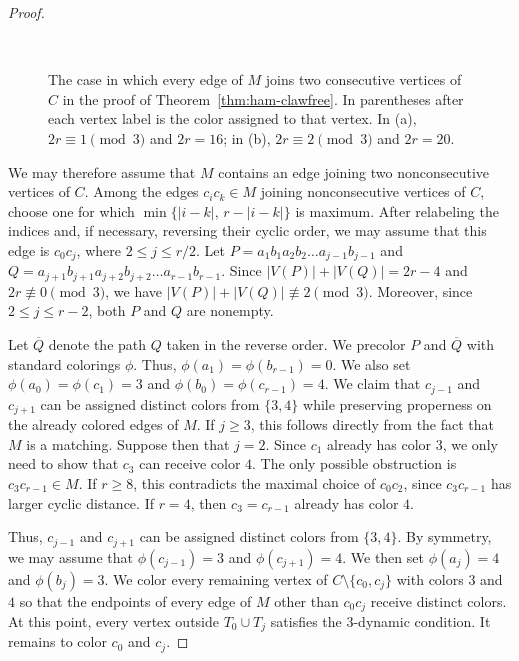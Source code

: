 \documentclass[10pt,a4paper]{article}
\theoremstyle{case}
\numberwithin{subcase}{case}
\begin{document}
\begin{proof}
\begin{figure}[H]
\begin{subfigure}{0.48\textwidth}
        \caption{$ $}
    \end{subfigure}

  \caption{The case in which every edge of $M$ joins two consecutive
vertices of $C$ in the proof of Theorem~\ref{thm:ham-clawfree}.
In parentheses after each vertex label is the color assigned to that
vertex. In (a), $2r\equiv1\pmod3$ and $2r=16$; in (b),
$2r\equiv2\pmod3$ and $2r=20$.}
    \label{fig:cubic-consecutive}
\end{figure}

We may therefore assume that $M$ contains an edge joining two
nonconsecutive vertices of $C$.
Among the edges $c_ic_k\in M$ joining nonconsecutive vertices of $C$,
choose one for which
$
\min\{|i-k|,\,r-|i-k|\}
$
is maximum. After relabeling the indices and, if necessary, reversing
their cyclic order, we may assume that this edge is $c_0c_j$, where
$
2\leq j\leq r/2.
$
Let
$
P=a_1b_1a_2b_2\ldots a_{j-1}b_{j-1}
$
and
$
Q=a_{j+1}b_{j+1}a_{j+2}b_{j+2}\ldots
a_{r-1}b_{r-1}.
$
Since
$
|V(P)|+|V(Q)|=2r-4
$
and $2r\not\equiv0\pmod3$, we have
$
|V(P)|+|V(Q)|\not\equiv2\pmod3.
$
Moreover, since $2\leq j\leq r-2$, both $P$ and $Q$ are nonempty.

Let $\overline{Q}$ denote the path $Q$ taken in the reverse order.
We precolor $P$ and $\overline{Q}$ with standard colorings $\phi$.
Thus, $\phi(a_1)=\phi(b_{r-1})=0$. We also set
$\phi(a_0)=\phi(c_1)=3$ and
$\phi(b_0)=\phi(c_{r-1})=4$.
We claim that $c_{j-1}$ and $c_{j+1}$ can be assigned distinct colors
from $\{3,4\}$ while preserving properness on the already colored edges
of $M$. If $j\geq3$, this follows directly from the fact that $M$ is a
matching. Suppose then that $j=2$. Since $c_1$ already has color $3$, we only
need to show that $c_3$ can receive color $4$. The only possible
obstruction is $c_3c_{r-1}\in M$. If $r\geq8$, this contradicts the
maximal choice of $c_0c_2$, since $c_3c_{r-1}$ has larger cyclic
distance. If $r=4$, then $c_3=c_{r-1}$ already has color $4$.

Thus, $c_{j-1}$ and $c_{j+1}$ can be assigned distinct colors from
$\{3,4\}$. By symmetry, we may assume that
$\phi(c_{j-1})=3$ and $\phi(c_{j+1})=4$. We then set
$\phi(a_j)=4$ and $\phi(b_j)=3$.
We color every remaining vertex of
$C\setminus\{c_0,c_j\}$ with colors $3$ and $4$ so that the endpoints
of every edge of $M$ other than $c_0c_j$ receive distinct colors.
At this point, every vertex outside $T_0\cup T_j$ satisfies the
$3$-dynamic condition. It remains to color $c_0$ and $c_j$.


\end{proof}
\end{document}
